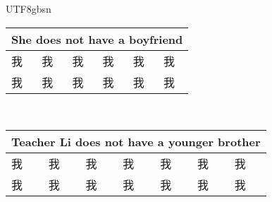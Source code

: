 \documentclass{article}
\newlength\mycolw
\newcommand{\myfont}{gbsn} %
\begin{document}
 
\begin{CJK}{UTF8}{\myfont} 

\Huge
\setlength{}
\addtolength\mycolw{-2\tabcolsep}
\begin{tabular}{|p{\mycolw}|p{\mycolw}|p{\mycolw}|p{\mycolw}|p{\mycolw}|p{\mycolw}|} \hline
\multicolumn{6}{|c|}{She does not have a boyfriend} \\ \hline
\color{white} 我 &\color{white} 我 &\color{white} 我 &\color{white} 我 &\color{white} 我 & \color{white} 我 \\ \hline
\color{white} 我 &\color{white} 我 &\color{white} 我 &\color{white} 我 &\color{white} 我 & \color{white} 我 \\ \hline
\end{tabular}
\\ \vspace{0.3 in}
\setlength{}
\addtolength\mycolw{-2\tabcolsep}
\begin{tabular}{|p{\mycolw}|p{\mycolw}|p{\mycolw}|p{\mycolw}|p{\mycolw}|p{\mycolw}|p{\mycolw}|} \hline
\multicolumn{7}{|c|}{Teacher Li does not have a younger brother} \\ \hline
\color{white} 我 &\color{white} 我 &\color{white} 我 &\color{white} 我 &\color{white} 我 &\color{white} 我 & \color{white} 我 \\ \hline
\color{white} 我 &\color{white} 我 &\color{white} 我 &\color{white} 我 &\color{white} 我 &\color{white} 我 & \color{white} 我 \\ \hline
\end{tabular}
\\ \vspace{0.3 in}

\end{CJK} 
\end{document}
